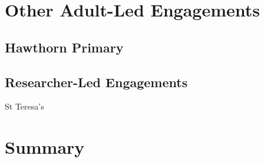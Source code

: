 \section{Other Adult-Led Engagements}

\subsection{Hawthorn Primary}

\subsection{Researcher-Led Engagements}

St Teresa's

\section{Summary}